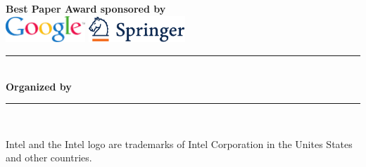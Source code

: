 \begin{center}

\vspace{7mm}
\textsf{\textbf{ Best Paper Award sponsored by}}\\
\vspace{3mm}
\includegraphics[height=1cm]{local_img/sponsors/NEW_Glogo_flat_CMYK_Coated}
\hspace{\separationwidth}
\includegraphics[height=1cm]{local_img/sponsors/Springer_cmyk}
\\

\rule{12cm}{1pt}\\[10pt]
\textsf{\textbf{Organized by }}
\hspace{2mm}

\vfill
\rule{12cm}{1pt}\\[10pt]
\end{center}
{\scriptsize Intel and the Intel logo are trademarks of Intel Corporation in the Unites States and other countries. }
